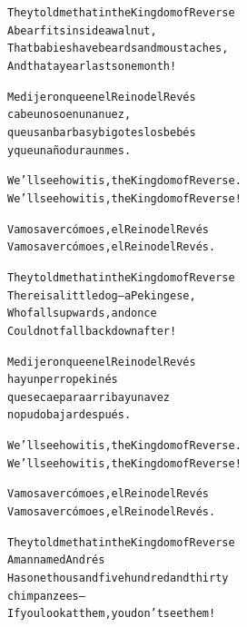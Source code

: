 \documentclass[11pt]{article}
\begin{document}
\begin{parcolumns}[distance=8em,nofirstindent=true]{2}
\colplacechunks

\colchunk
{
\begin{alltt}\normalfont
They told me that in the Kingdom of Reverse
A bear fits inside a walnut,
That babies have beards and moustaches,
And that a year lasts one month!
\end{alltt}
}

\colchunk
{
\begin{alltt}\normalfont
Me dijeron que en el Reino del Revés
cabe un oso en una nuez,
que usan barbas y bigotes los bebés
y que un año dura un mes.
\end{alltt}
}

\colplacechunks

\colchunk
{
\begin{alltt}\normalfont
We’ll see how it is, the Kingdom of Reverse.
We’ll see how it is, the Kingdom of Reverse!
\end{alltt}
}

\colchunk
{
\begin{alltt}\normalfont
Vamos a ver cómo es, el Reino del Revés
Vamos a ver cómo es, el Reino del Revés.
\end{alltt}
}

\colplacechunks

\colchunk
{
\begin{alltt}\normalfont
They told me that in the Kingdom of Reverse
There is a little dog – a Pekingese,
Who falls upwards, and once
Could not fall back down after!
\end{alltt}
}

\colchunk
{
\begin{alltt}\normalfont
Me dijeron que en el Reino del Revés
hay un perro pekinés
que se cae para arriba y una vez
no pudo bajar después.
\end{alltt}
}

\colplacechunks

\colchunk
{
\begin{alltt}\normalfont
We’ll see how it is, the Kingdom of Reverse.
We’ll see how it is, the Kingdom of Reverse!
\end{alltt}
}

\colchunk
{
\begin{alltt}\normalfont
Vamos a ver cómo es, el Reino del Revés
Vamos a ver cómo es, el Reino del Revés.
\end{alltt}
}

\colplacechunks

\colchunk
{
\begin{alltt}\normalfont
They told me that in the Kingdom of Reverse
A man named Andrés
Has one thousand five hundred and thirty
chimpanzees –
If you look at them, you don’t see them!
\end{alltt}
}


\end{parcolumns}
\end{document}
